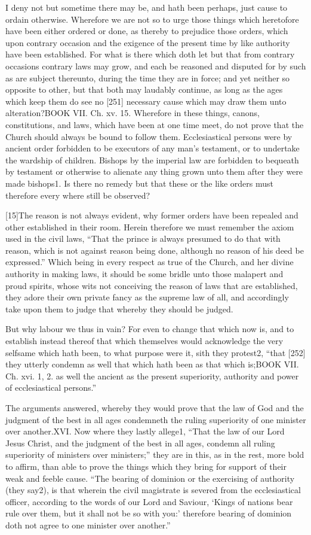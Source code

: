 I deny not but sometime there may be, and hath been perhaps, just cause to ordain otherwise. Wherefore we are not so to urge those things which heretofore have been either ordered or done, as thereby to prejudice those orders, which upon contrary occasion and the exigence of the present time by like authority have been established. For what is there which doth let but that from contrary occasions contrary laws may grow, and each be reasoned and disputed for by such as are subject thereunto, during the time they are in force; and yet neither so opposite to other, but that both may laudably continue, as long as the ages which keep them do see no [251] necessary cause which may draw them unto alteration?BOOK VII. Ch. xv. 15. Wherefore in these things, canons, constitutions, and laws, which have been at one time meet, do not prove that the Church should always be bound to follow them. Ecclesiastical persons were by ancient order forbidden to be executors of any man’s testament, or to undertake the wardship of children. Bishops by the imperial law are forbidden to bequeath by testament or otherwise to alienate any thing grown unto them after they were made bishops1. Is there no remedy but that these or the like orders must therefore every where still be observed?

[15]The reason is not always evident, why former orders have been repealed and other established in their room. Herein therefore we must remember the axiom used in the civil laws, “That the prince is always presumed to do that with reason, which is not against reason being done, although no reason of his deed be expressed.” Which being in every respect as true of the Church, and her divine authority in making laws, it should be some bridle unto those malapert and proud spirits, whose wits not conceiving the reason of laws that are established, they adore their own private fancy as the supreme law of all, and accordingly take upon them to judge that whereby they should be judged.

But why labour we thus in vain? For even to change that which now is, and to establish instead thereof that which themselves would acknowledge the very selfsame which hath been, to what purpose were it, sith they protest2, “that [252] they utterly condemn as well that which hath been as that which is;BOOK VII. Ch. xvi. 1, 2. as well the ancient as the present superiority, authority and power of ecclesiastical persons.”

The arguments answered, whereby they would prove that the law of God and the judgment of the best in all ages condemneth the ruling superiority of one minister over another.XVI. Now where they lastly allege1, “That the law of our Lord Jesus Christ, and the judgment of the best in all ages, condemn all ruling superiority of ministers over ministers;” they are in this, as in the rest, more bold to affirm, than able to prove the things which they bring for support of their weak and feeble cause. “The bearing of dominion or the exercising of authority (they say2), is that wherein the civil magistrate is severed from the ecclesiastical officer, according to the words of our Lord and Saviour, ‘Kings of nations bear rule over them, but it shall not be so with you:’ therefore bearing of dominion doth not agree to one minister over another.”

